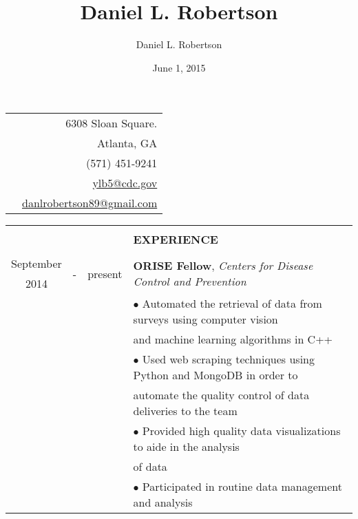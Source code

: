 \documentclass[11pt]{article}
\title{Daniel L. Robertson}
\date{June 1, 2015}
\author{Daniel L. Robertson}
\begin{document}
    \normalfont
    \begin{table}[ht]
        \begin{tabular}{p{13cm}r}
            \multirow{5}{*}{\hspace*{1cm}\color{maroon}{\huge\textbf{Daniel L. Robertson}}} & 6308 Sloan Square.\\
            & Atlanta, GA\\
            & (571) 451-9241\\
            & \href{mailto:ylb5@cdc.gov}{ylb5@cdc.gov}\\
            & \href{mailto:danlrobertson89@gmail.com}{danlrobertson89@gmail.com}\\
        \end{tabular}
        \begin{tabular}{@{\hspace{0mm}}c@{\hspace{1mm}}c@{\hspace{3mm}}cl}
            & & & \color{maroon}{\rule{14cm}{1.1pt}}\\
            & & & \large{\textbf{EXPERIENCE}}\\
            & & & \color{maroon}{\rule{14cm}{1.1pt}}\\
            September & \multirow{2}{*}{-} & \multirow{2}{*}{present} & \multirow{2}{*}{\textbf{ORISE Fellow}, \textit{Centers for Disease Control and Prevention}}\\
            2014 & & &\\
            & & & $\bullet$ Automated the retrieval of data from surveys using computer vision\\
            & & & \hspace*{4mm}and machine learning algorithms in C++\\
            & & & $\bullet$ Used web scraping techniques using Python and MongoDB in order to\\
            & & & \hspace*{4mm}automate the quality control of data deliveries to the team\\
            & & & $\bullet$ Provided high quality data visualizations to aide in the analysis\\
            & & & \hspace*{4mm}of data\\
            & & & $\bullet$ Participated in routine data management and analysis\\

\end{tabular}
\end{table}
\end{document}
